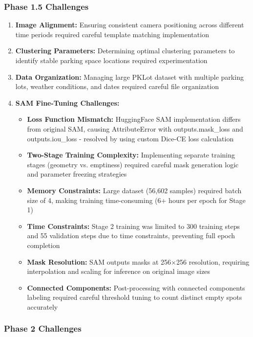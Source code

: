 \documentclass[12pt,a4paper]{article}
\begin{document}
\subsubsection{Phase 1.5 Challenges}

\begin{enumerate}
    \item \textbf{Image Alignment:} Ensuring consistent camera positioning across different time periods required careful template matching implementation
    \item \textbf{Clustering Parameters:} Determining optimal clustering parameters to identify stable parking space locations required experimentation
    \item \textbf{Data Organization:} Managing large PKLot dataset with multiple parking lots, weather conditions, and dates required careful file organization
    \item \textbf{SAM Fine-Tuning Challenges:}
    \begin{itemize}
        \item \textbf{Loss Function Mismatch:} HuggingFace SAM implementation differs from original SAM, causing AttributeError with outputs.mask\_loss and outputs.iou\_loss - resolved by using custom Dice-CE loss calculation
        \item \textbf{Two-Stage Training Complexity:} Implementing separate training stages (geometry vs. emptiness) required careful mask generation logic and parameter freezing strategies
        \item \textbf{Memory Constraints:} Large dataset (56,602 samples) required batch size of 4, making training time-consuming (6+ hours per epoch for Stage 1)
        \item \textbf{Time Constraints:} Stage 2 training was limited to 300 training steps and 55 validation steps due to time constraints, preventing full epoch completion
        \item \textbf{Mask Resolution:} SAM outputs masks at 256×256 resolution, requiring interpolation and scaling for inference on original image sizes
        \item \textbf{Connected Components:} Post-processing with connected components labeling required careful threshold tuning to count distinct empty spots accurately
    \end{itemize}
\end{enumerate}

\subsubsection{Phase 2 Challenges}
\end{document}
